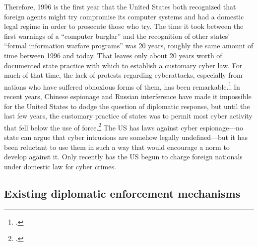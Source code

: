 \documentclass{memoir}
\begin{document}
\begin{refsegment}
Therefore, 1996 is the first year that the United States both recognized that foreign agents might try compromise its computer systems and had a domestic legal regime in order to prosecute those who try. The time it took between the first warnings of a ``computer burglar'' and the recognition of other states' ``formal information warfare programs'' was 20 years, roughly the same amount of time between 1996 and today. That leaves only about 20 years worth of documented state practice with which to establish a customary cyber law. For much of that time, the lack of protests regarding cyberattacks, especially from nations who have suffered obnoxious forms of them, has been remarkable.\footcite[p.~132]{brown_customary_2012} In recent years, Chinese espionage and Russian interference have made it impossible for the United States to dodge the question of diplomatic response, but until the last few years, the customary practice of states was to permit most cyber activity that fell below the use of force.\footcite[p.~141]{brown_customary_2012} The US has laws against cyber espionage---no state can argue that cyber intrusions are somehow legally undefined---but it has been reluctant to use them in such a way that would encourage a norm to develop against it. Only recently has the US begun to charge foreign nationals under domestic law for cyber crimes.

\subsection{Existing diplomatic enforcement mechanisms}


\end{refsegment}
\end{document}

